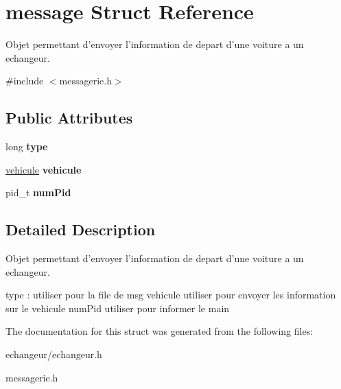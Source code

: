 \hypertarget{structmessage}{\section{message Struct Reference}
\label{structmessage}
}


Objet permettant d'envoyer l'information de depart d'une voiture a un echangeur.  




{\ttfamily \#include $<$messagerie.\-h$>$}

\subsection*{Public Attributes}
\begin{DoxyCompactItemize}
\item 
\hypertarget{structmessage_a1cdab6b2ccaa58f6554778dc58bca8cd}{long {\bfseries type}}\label{structmessage_a1cdab6b2ccaa58f6554778dc58bca8cd}

\item 
\hypertarget{structmessage_ae2dcd4a5922d12624ab3662b437646e8}{\hyperlink{structvehicule}{vehicule} {\bfseries vehicule}}\label{structmessage_ae2dcd4a5922d12624ab3662b437646e8}

\item 
\hypertarget{structmessage_ae19bbd0a166457b489b7d798d7157a94}{pid\-\_\-t {\bfseries num\-Pid}}\label{structmessage_ae19bbd0a166457b489b7d798d7157a94}

\end{DoxyCompactItemize}


\subsection{Detailed Description}
Objet permettant d'envoyer l'information de depart d'une voiture a un echangeur. 

type \-: utiliser pour la file de msg vehicule utiliser pour envoyer les information sur le vehicule num\-Pid utiliser pour informer le main 

The documentation for this struct was generated from the following files\-:\begin{DoxyCompactItemize}
\item 
echangeur/echangeur.\-h\item 
messagerie.\-h\end{DoxyCompactItemize}
